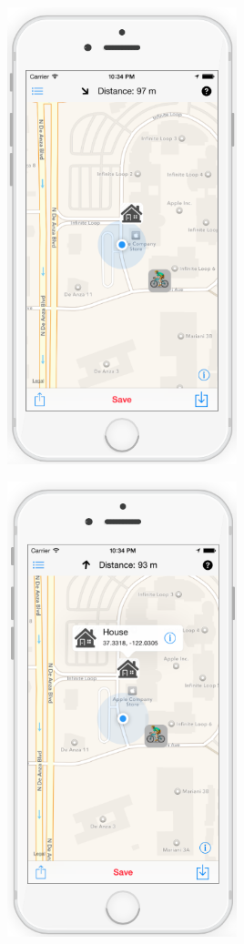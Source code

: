 \documentclass[thesis=M,english]{FITthesis}[2012/10/20]
\begin{document}
\begin{center}
\includegraphics[width=0.5\textwidth]{images/screenshots/main_screen_device}

\includegraphics[width=0.5\textwidth]{images/screenshots/main_screen_detail_device}


\end{center}
\end{document}
